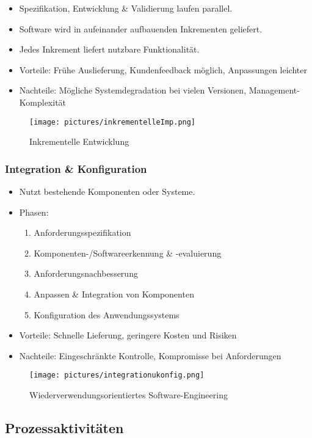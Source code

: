 \documentclass[12pt,a4paper,oneside]{article}
\begin{document}
\begin{itemize}
\item Spezifikation, Entwicklung \& Validierung laufen parallel.
\item Software wird in aufeinander aufbauenden Inkrementen geliefert.
\item Jedes Inkrement liefert nutzbare Funktionalität.
\item Vorteile: Frühe Auslieferung, Kundenfeedback möglich, Anpassungen leichter
\item Nachteile: Mögliche Systemdegradation bei vielen Versionen, Management-Komplexität
\end{itemize}

\begin{figure}[H]
\centering
\texttt{[image: pictures/inkrementelleImp.png]}
\caption{Inkrementelle Entwicklung}
\end{figure}

\subsubsection{Integration \& Konfiguration}

\begin{itemize}
\item Nutzt bestehende Komponenten oder Systeme.
\item Phasen:
\begin{enumerate}
\item Anforderungsspezifikation
\item Komponenten-/Softwareerkennung \& -evaluierung
\item Anforderungsnachbesserung
\item Anpassen \& Integration von Komponenten
\item Konfiguration des Anwendungssystems
\end{enumerate}
\item Vorteile: Schnelle Lieferung, geringere Kosten und Risiken
\item Nachteile: Eingeschränkte Kontrolle, Kompromisse bei Anforderungen
\end{itemize}

\begin{figure}[H]
\centering
\texttt{[image: pictures/integrationukonfig.png]}
\caption{Wiederverwendungsorientiertes Software-Engineering}
\end{figure}

\subsection{Prozessaktivitäten}
\end{document}
